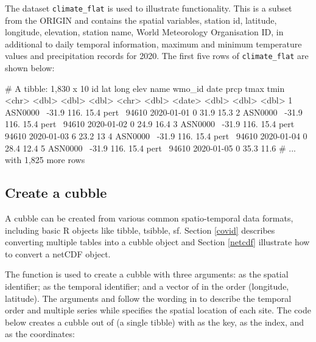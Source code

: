 \documentclass[
]{jss}
\begin{document}
The dataset \texttt{climate\_flat} is used to illustrate  functionality. This is a subset from the ORIGIN and contains the spatial variables, station id, latitude, longitude, elevation, station name, World Meteorology Organisation ID, in additional to daily temporal information, maximum and minimum temperature values and precipitation records for 2020. The first five rows of \texttt{climate\_flat} are shown below:

\begin{CodeChunk}
\begin{CodeOutput}
# A tibble: 1,830 x 10
  id         lat  long  elev name  wmo_id date        prcp  tmax  tmin
  <chr>    <dbl> <dbl> <dbl> <chr>  <dbl> <date>     <dbl> <dbl> <dbl>
1 ASN0000~ -31.9  116.  15.4 pert~  94610 2020-01-01     0  31.9  15.3
2 ASN0000~ -31.9  116.  15.4 pert~  94610 2020-01-02     0  24.9  16.4
3 ASN0000~ -31.9  116.  15.4 pert~  94610 2020-01-03     6  23.2  13  
4 ASN0000~ -31.9  116.  15.4 pert~  94610 2020-01-04     0  28.4  12.4
5 ASN0000~ -31.9  116.  15.4 pert~  94610 2020-01-05     0  35.3  11.6
# ... with 1,825 more rows
\end{CodeOutput}
\end{CodeChunk}

\hypertarget{create}{%
\subsection{Create a cubble}\label{create}}

A cubble can be created from various common spatio-temporal data formats, including basic R objects like tibble, tsibble, sf. Section \ref{covid} describes converting multiple tables into a cubble object and Section \ref{netcdf} illustrate how to convert a netCDF object.

The function  is used to create a cubble with three arguments:  as the spatial identifier;  as the temporal identifier; and a vector of  in the order (longitude, latitude). The arguments  and  follow the wording in  to describe the temporal order and multiple series while  specifies the spatial location of each site. The code below creates a cubble out of  (a single tibble) with  as the key,  as the index, and  as the coordinates:
\end{document}
